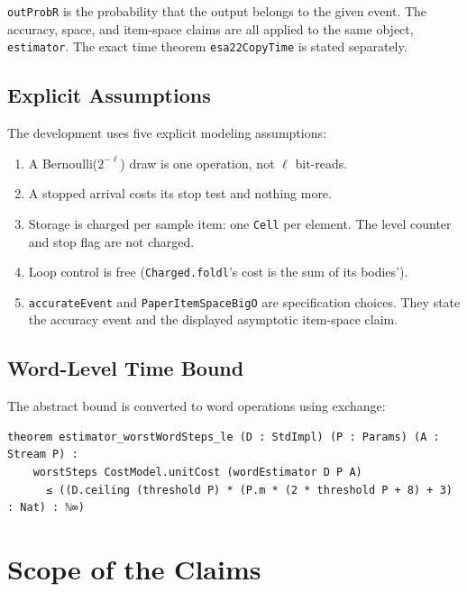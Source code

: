 \documentclass[acmsmall,nonacm]{acmart}
\begin{document}
\lstinline{outProbR} is the probability that the output belongs to the given event.
The accuracy, space, and item-space claims are all applied to the same object, \lstinline{estimator}.
The exact time theorem \lstinline{esa22CopyTime} is stated separately.

\subsection{Explicit Assumptions}\label{sec:assumptions}

The development uses five explicit modeling assumptions:

\begin{enumerate}
  \item A Bernoulli($2^{-\ell}$) draw is one operation, not $\ell$ bit-reads.
  \item A stopped arrival costs its stop test and nothing more.
  \item Storage is charged per sample item: one \lstinline{Cell} per element. The level counter and stop flag are not charged.
  \item Loop control is free (\lstinline{Charged.foldl}'s cost is the sum of its bodies').
  \item \lstinline{accurateEvent} and \lstinline{PaperItemSpaceBigO} are specification choices. They state the accuracy event and the displayed asymptotic item-space claim.
\end{enumerate}

\subsection{Word-Level Time Bound}\label{sec:word-time}

The abstract bound is converted to word operations using exchange:

\begin{lstlisting}
theorem estimator_worstWordSteps_le (D : StdImpl) (P : Params) (A : Stream P) :
    worstSteps CostModel.unitCost (wordEstimator D P A)
      ≤ ((D.ceiling (threshold P) * (P.m * (2 * threshold P + 8) + 3) : Nat) : ℕ∞)
\end{lstlisting}


\section{Scope of the Claims}\label{sec:limitations}
\end{document}
